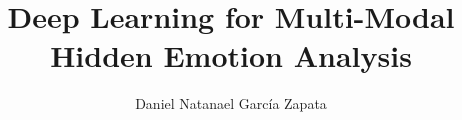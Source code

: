 \documentclass[a4paper,12pt,twoside]{report}
\begin{document}
\title{
      \LARGE {\bf Deep Learning for Multi-Modal Hidden Emotion Analysis}
      \vspace*{6mm}
  }
	\author{Daniel Natanael Garc\'{i}a Zapata}
	\normallinespacing
\maketitle

\preface




\body



























\appendix



\end{document}
